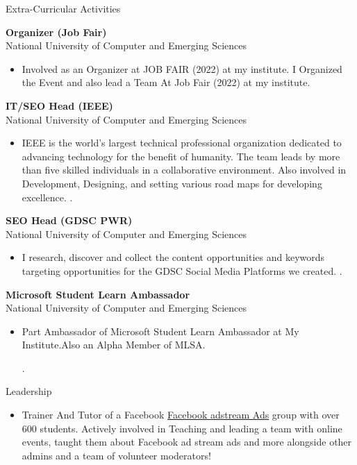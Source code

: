 \documentclass{resume}
\begin{document}
\begin{rSection}{Extra-Curricular Activities} 

 \textbf{Organizer (Job Fair)} \\
National University of Computer and Emerging Sciences
 \begin{itemize}
     \item Involved as an Organizer at JOB FAIR (2022) at my institute. I Organized the Event and also lead a Team At Job Fair (2022) at my institute. 
     
 \end{itemize}

 \textbf{IT/SEO Head (IEEE)} \\
National University of Computer and Emerging Sciences
 \begin{itemize}
     \item IEEE is the world’s largest technical professional organization dedicated to advancing technology
 for the benefit of humanity.
The team leads by more than five skilled individuals in a collaborative environment. Also involved 
in Development, Designing, and setting various road maps for developing excellence.
.
     
 \end{itemize}

 \textbf{SEO Head (GDSC PWR)	} \\
National University of Computer and Emerging Sciences
 \begin{itemize}
     \item I research, discover and collect the content opportunities and keywords targeting opportunities for
 the GDSC Social Media Platforms we created.
.
     
 \end{itemize}

 \textbf{Microsoft Student Learn Ambassador	} \\
National University of Computer and Emerging Sciences
 \begin{itemize}
     \item Part  Ambassador of Microsoft Student Learn Ambassador at My Institute.Also an Alpha Member of MLSA.

.
     
 \end{itemize}


\end{rSection}

\begin{rSection}{Leadership} 
\begin{itemize}
    \item Trainer And Tutor of a Facebook \href{}{Facebook adstream Ads} group with over 600 students. Actively involved in Teaching and leading a team with online events, taught them about Facebook ad stream ads  and more alongside other admins and a team of volunteer moderators! 
\end{itemize}


\end{rSection}
\end{document}

